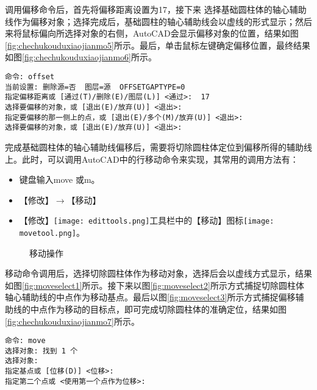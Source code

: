 \begin{procedure}
调用偏移命令后，首先将偏移距离设置为17，接下来 选择基础圆柱体的轴心辅助线作为偏移对象；选择完成后，基础圆柱的轴心辅助线会以虚线的形式显示；然后来将鼠标偏向所选择对象的右侧，AutoCAD会显示偏移对象的位置，结果如图\ref{fig:chechukouduxiaojianmo5}所示。最后，单击鼠标左键确定偏移位置，最终结果如图\ref{fig:chechukouduxiaojianmo6}所示。
\begin{lstlisting}
命令: offset
当前设置: 删除源=否  图层=源  OFFSETGAPTYPE=0
指定偏移距离或 [通过(T)/删除(E)/图层(L)] <通过>:  17
选择要偏移的对象，或 [退出(E)/放弃(U)] <退出>:
指定要偏移的那一侧上的点，或 [退出(E)/多个(M)/放弃(U)] <退出>:
选择要偏移的对象，或 [退出(E)/放弃(U)] <退出>:
\end{lstlisting}

完成基础圆柱体的轴心辅助线偏移后，需要将切除圆柱体定位到偏移所得的辅助线上。此时，可以调用AutoCAD中的行移动命令来实现，其常用的调用方法有：

\begin{itemize}
	\item 键盘输入move 或m。
  \item 【修改】$\rightarrow$【移动】
  \item 【修改】\texttt{[image: edittools.png]}工具栏中的【移动】图标\texttt{[image: movetool.png]}。
\end{itemize}

\begin{figure}[htbp]%
\centering
{}\hspace{10pt}
\hspace{10pt}
\hspace{10pt}
\caption{移动操作}
\end{figure}

移动命令调用后，选择切除圆柱体作为移动对象，选择后会以虚线方式显示，结果如图\ref{fig:moveselect1}所示。接下来以图\ref{fig:moveselect2}所示方式捕捉切除圆柱体轴心辅助线的中点作为移动基点。最后以图\ref{fig:moveselect3}所示方式捕捉偏移辅助线的中点作为移动的目标点，即可完成切除圆柱体的准确定位，结果如图\ref{fig:chechukouduxiaojianmo7}所示。

\begin{lstlisting}
命令: move
选择对象: 找到 1 个
选择对象:
指定基点或 [位移(D)] <位移>:
指定第二个点或 <使用第一个点作为位移>:
\end{lstlisting}


\end{procedure}
